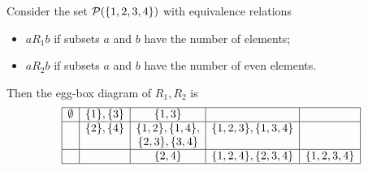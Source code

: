 \begin{example}
Consider the set $\operatorname{\mathcal{P}}(\{1,2,3,4\})$ with equivalence relations
\begin{itemize}
\item $aR_1 b$ if subsets $a$ and $b$ have the number of elements;
\item $aR_2 b$ if subsets $a$ and $b$ have the number of even elements.
\end{itemize}
Then the egg-box diagram of $R_1,R_2$ is
\[ \begin{array}{|c|c|c|c|c|}
\hline
\emptyset & \{1\}, \{3\} & \{1,3\} && \\ \hline
& \{2\}, \{4\} & \{1,2\}, \{1,4\}, & \{1,2,3\}, \{1,3,4\} & \\
&  & \{2,3\}, \{3,4\} &  & \\ \hline
&& \{2,4\} & \{1,2,4\}, \{2,3,4\}  & \{1,2,3,4\}    \\ \hline
\end{array} \]
\end{example}

